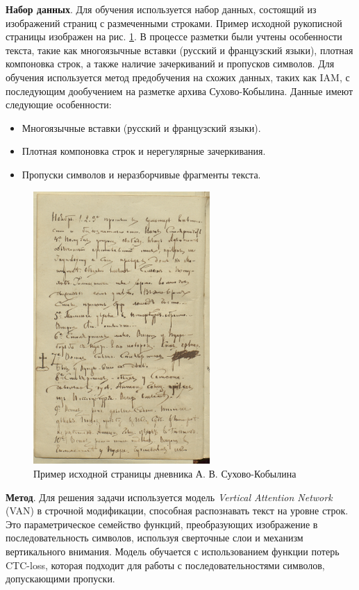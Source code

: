 \documentclass{extarticle}
\begin{document}
\textbf{Набор данных}. Для обучения используется набор данных, состоящий из изображений страниц с размеченными строками. Пример исходной рукописной страницы изображен на рис. \ref{fig:example_page}. В процессе разметки были учтены особенности текста, такие как многоязычные вставки (русский и французский языки), плотная компоновка строк, а также наличие зачеркиваний и пропусков символов. Для обучения используется метод предобучения на схожих данных, таких как IAM, с последующим дообучением на разметке архива Сухово-Кобылина. Данные имеют следующие особенности:
\begin{itemize}
	\item Многоязычные вставки (русский и французский языки).
	\item Плотная компоновка строк и нерегулярные зачеркивания.
	\item Пропуски символов и неразборчивые фрагменты текста.
\end{itemize}

\begin{figure}[h!]
	\centering
	\includegraphics[width=0.6\textwidth]{images/пример.jpg}
	\caption{Пример исходной страницы дневника А. В. Сухово-Кобылина}
	\label{fig:example_page}
\end{figure}

\textbf{Метод}. Для решения задачи используется модель \textit{Vertical Attention Network} (VAN) в строчной модификации, способная распознавать текст на уровне строк. Это параметрическое семейство функций, преобразующих изображение в последовательность символов, используя сверточные слои и механизм вертикального внимания. Модель обучается с использованием функции потерь CTC-loss, которая подходит для работы с последовательностями символов, допускающими пропуски.
\end{document}
